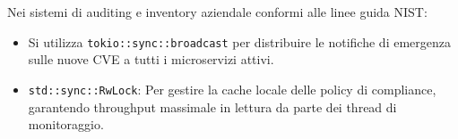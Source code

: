 \documentclass[11pt,a4paper]{article}
\begin{document}
\begin{altbox}
Nei sistemi di auditing e inventory aziendale conformi alle linee guida NIST:
\begin{itemize}
    \item Si utilizza \texttt{tokio::sync::broadcast} per distribuire le notifiche di emergenza sulle nuove CVE a tutti i microservizi attivi.
    \item \texttt{std::sync::RwLock}: Per gestire la cache locale delle policy di compliance, garantendo throughput massimale in lettura da parte dei thread di monitoraggio.
\end{itemize}
\end{altbox}
\end{document}
